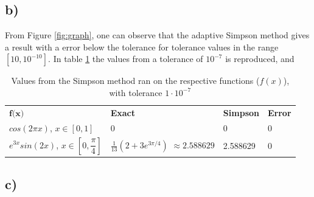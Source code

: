 \documentclass[12pt, a4paper,usenames,dvipsnames]{article}
\begin{document}
\thispagestyle{noheader}
\label{fig:graph}

\subsection*{b)}

From Figure \ref{fig:graph}, one can observe that the adaptive Simpson method gives a result with a error below the tolerance for tolerance values in the range \([10,10^{-10}]\). In table \ref{tab:simps} the values from a tolerance of \(10^{-7}\) is reproduced, and 
\begin{table}[h]
\centering
\begin{tabular}{p{2cm}p{2.5cm}ll}

\rowcolor{XKCDpale}$\textbf{f(x)}$                     & \textbf{Exact}               & \textbf{Simpson} & \textbf{Error} \\ 
$cos(2 \pi x)$, \newline$x \in [0, 1]$      & 0                            & 0          & 0       \\ 
$e^{3x}sin(2x)$, \newline$x \in [0, \dfrac{\pi}{4}]$ & $\frac{1}{13}(2+3e^{3\pi/4})$ \newline$\approx 2.588629$& 2.588629          & 0       \\ 
\end{tabular}
\caption{Values from the Simpson method ran on the respective functions ($f(x)$), with tolerance $1\cdot10^{-7}$}
\label{tab:simps}
\end{table}
\restoregeometry
\subsection*{c)}
\end{document}
